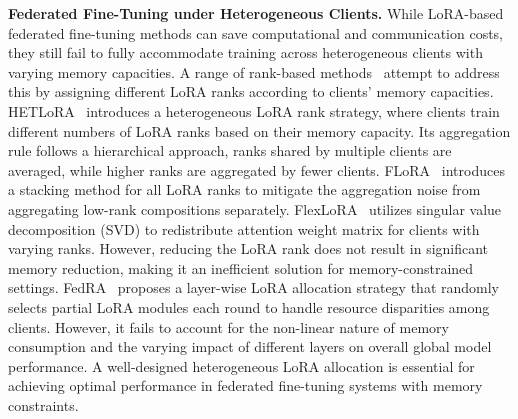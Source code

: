 \documentclass[sigconf]{acmart}
\begin{document}
\textbf{Federated Fine-Tuning under Heterogeneous Clients.} While LoRA-based federated fine-tuning methods can save computational and communication costs, they still fail to fully accommodate training across heterogeneous clients with varying memory capacities. A range of rank-based methods~\cite{cho2024heterogeneous,wangflora,bai2024federated} attempt to address this by assigning different LoRA ranks according to clients' memory capacities.
HETLoRA~\cite{cho2024heterogeneous} introduces a heterogeneous LoRA rank strategy, where clients train different numbers of LoRA ranks based on their memory capacity. Its aggregation rule follows a hierarchical approach, ranks shared by multiple clients are averaged, while higher ranks are aggregated by fewer clients.
FLoRA~\cite{wangflora} introduces a stacking method for all LoRA ranks to mitigate the aggregation noise from aggregating low-rank compositions separately. FlexLoRA~\cite{bai2024federated} utilizes singular value decomposition (SVD) to redistribute attention weight matrix for clients with varying ranks. However, reducing the LoRA rank does not result in significant memory reduction, making it an inefficient solution for memory-constrained settings.
FedRA~\cite{su2023fedra} proposes a layer-wise LoRA allocation strategy that randomly selects partial LoRA modules each round to handle resource disparities among clients. However, it fails to account for the non-linear nature of memory consumption and the varying impact of different layers on overall global model performance.
A well-designed heterogeneous LoRA allocation is essential for achieving optimal performance in federated fine-tuning systems with memory constraints. %
\end{document}
